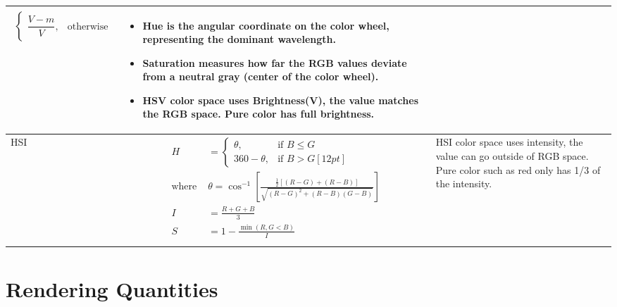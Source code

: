 \documentclass[UTF8]{ctexart}
\begin{document}
\begin{table}[h]
\begin{tabularx}{\textwidth}{| l | X | X |}
$$\begin{aligned}
\begin{cases}
			\dfrac{V - m}{V}, & \text{otherwise}
		\end{cases}
	\end{aligned}$$  
	&  \begin{itemize}
		\item Hue is the angular coordinate on the color wheel, representing the dominant wavelength. 
		\item Saturation measures how far the RGB values deviate from a neutral gray (center of the color wheel). 
		\item HSV color space uses Brightness(V), the value matches the RGB space. Pure color has full brightness.
	\end{itemize} \\
	\hline
	HSI 
	& $$ 
	\begin{aligned}
		H &=
		\begin{cases}
			\theta, & \text{if } B\leq G \\[12pt]
			360 - \theta, &\text{if } B > G[12pt]
		\end{cases} \\
		\text{where } &\theta = \cos^{-1}\left[ \frac{\frac{1}{2}[(R-G) + (R-B)]}{\sqrt{(R-G)^2 + (R-B)(G-B)}} \right] \\
		I &= \frac{R+G+B}{3} \\
		S &= 1 - \frac{\min(R, G< B)}{I} \\
	\end{aligned}
	$$   
	& HSI color space uses intensity, the value can go outside of RGB space. Pure color such as red only has 1/3 of the intensity. \\
	\hline
\end{tabularx} 	
\end{table}

\FloatBarrier %
\section*{Rendering Quantities}
\end{document}
